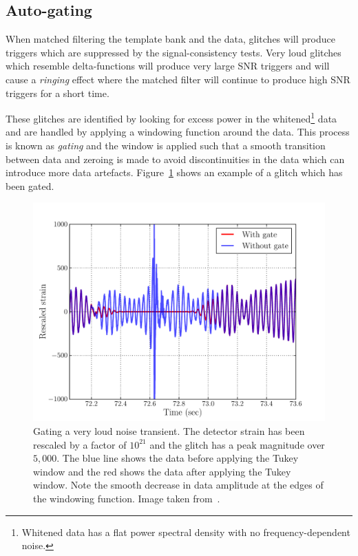 \subsection{\label{2:sec:auto-gating}Auto-gating}

When matched filtering the template bank and the data, glitches will produce triggers which are suppressed by the signal-consistency tests. Very loud glitches which resemble delta-functions will produce very large SNR triggers and will cause a \textit{ringing} effect where the matched filter will continue to produce high SNR triggers for a short time.

These glitches are identified by looking for excess power in the whitened\footnote{Whitened data has a flat power spectral density with no frequency-dependent noise.} data and are handled by applying a windowing function around the data. This process is known as \textit{gating} and the window is applied such that a smooth transition between data and zeroing is made to avoid discontinuities in the data which can introduce more data artefacts. Figure~\ref{2:fig:autogating} shows an example of a glitch which has been gated.
%
\begin{figure}
    \centering
    \includegraphics[width=0.9\linewidth]{images/2_searches/autogating.pdf}
    \caption{Gating a very loud noise transient. The detector strain has been rescaled by a factor of $10^{21}$ and the glitch has a peak magnitude over $5,000$. The blue line shows the data before applying the Tukey window and the red shows the data after applying the Tukey window. Note the smooth decrease in data amplitude at the edges of the windowing function. Image taken from~\cite{PyCBC:2016}.}
    \label{2:fig:autogating}
\end{figure}
%

